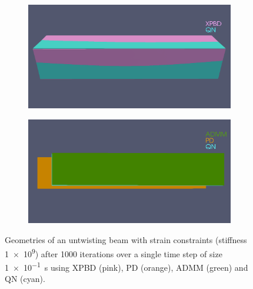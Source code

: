 \begin{figure}
    \centering
    \begin{subfigure}{0.49\textwidth}
        \includegraphics[width=\textwidth, trim={0 5.0cm 0 2.5cm}, clip]{figures/strain_beam_untwist_QN_vs_XPBD_large_ts.png}
    \end{subfigure}
    \hspace{0.001\textwidth}
    \begin{subfigure}{0.49\textwidth}
        \includegraphics[width=\textwidth, trim={0 4.5cm 0 2.15cm}, clip]{figures/strain_beam_untwist_QN_vs_ADMM_vs_PD_large_ts.png}
    \end{subfigure}
    \caption{Geometries of an untwisting beam with strain constraints (stiffness \num{1e9}) after 1000 iterations over a single time step of size 
    \SI{1e-1}{\second} using XPBD (pink), PD (orange), ADMM (green) and QN (cyan).}
    \label{fig:strain-beam-untwist-geometries-large-ts}
\end{figure}

